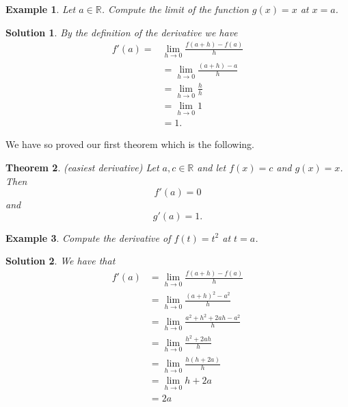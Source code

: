 \documentclass[12pt,a4paper]{book}
\newtheorem{theorem}{Theorem}[section]
\newtheorem{Example}[theorem]{Example}
\numberwithin{equation}{section}
\newtheorem*{solution}{{\bf Solution}}
\begin{document}
\begin{tcolorbox}[width=\textwidth,colback={green!20},title={},colbacktitle=yellow,coltitle=blue]
\begin{Example}
Let $a\in \mathbb{R}$. Compute the limit of the function $g(x)=x$ at $x=a$.
\end{Example}

\begin{solution}
By the definition of the derivative we have 
\begin{equation*}
\begin{split}
f'(a)=&\lim_{h\to 0}\frac{f(a+h)-f(a)}{h}\\
& =\lim_{h\to 0}\frac{(a+h)-a}{h}\\
& =\lim_{h\to 0}\frac{h}{h}\\
&=\lim_{h\to 0} 1\\
&=1. 
\end{split}
\end{equation*}
\end{solution}
\end{tcolorbox}

We have so proved our first theorem which is the following.
\begin{tcolorbox}[width=\textwidth,colback={green!20},title={},colbacktitle=yellow,coltitle=blue]
\begin{theorem}(easiest derivative)
Let $a,c\in \mathbb{R}$ and let $f(x)=c$ and $g(x)=x$. Then 
$$f'(a)=0$$
and 
$$g'(a)=1.$$
\end{theorem}
\end{tcolorbox}
\begin{tcolorbox}[width=\textwidth,colback={green!20},title={},colbacktitle=yellow,coltitle=blue]
\begin{Example}
Compute the derivative of $f(t)=t^2$ at $t=a$.
\end{Example}

\begin{solution}
We have that 
\begin{equation*}
\begin{split}
f'(a)&=\lim_{h\to 0}\frac{f(a+h)-f(a)}{h}\\
&=\lim_{h\to 0}\frac{(a+h)^2-a^2}{h}\\
&=\lim_{h\to 0}\frac{a^2+h^2+2ah-a^2}{h}\\
&=\lim_{h\to 0}\frac{h^2+2ah}{h}\\
&=\lim_{h\to 0}\frac{h(h+2a)}{h}\\
&=\lim_{h\to 0}h+2a\\
&=2a
\end{split}
\end{equation*}	
\end{solution}
\end{tcolorbox}
\end{document}
